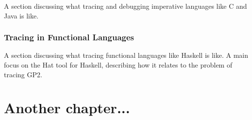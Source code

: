 \documentclass[authoryearcitations]{UoYCSproject}
\begin{document}
A section discussing what tracing and debugging imperative languages like C and
Java is like.


\subsection{Tracing in Functional Languages}
\label{sec:TracingInFunctionalLanguages}

A section discussing what tracing functional languages like Haskell is like. A
main focus on the Hat tool for Haskell, describing how it relates to the
problem of tracing GP2.




\cleardoublepage

\chapter{Another chapter...}
\end{document}
